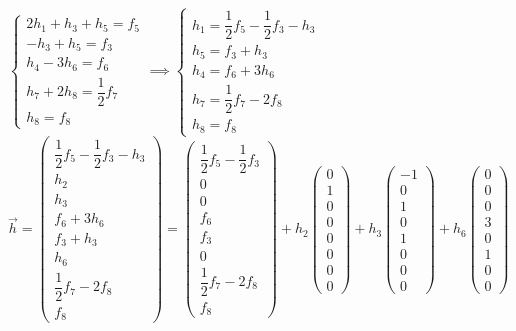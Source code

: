 \documentclass[a4paper, 10pt]{article}
\theoremstyle{theoremdd}
\begin{document}
$\begin{cases}
2h_1 + h_3 + h_5 = f_5 \\
-h_3 + h_5 = f_3 \\
h_4 - 3h_6 = f_6 \\
h_7 + 2h_8 = \dfrac{1}{2}f_7 \\
h_8 = f_8
\end{cases} \implies \begin{cases}
h_1 = \dfrac{1}{2}f_5 - \dfrac{1}{2}f_3 - h_3 \\
h_5 = f_3 + h_3 \\
h_4 = f_6 + 3h_6 \\
h_7 = \dfrac{1}{2}f_7 - 2f_8 \\
h_8 = f_8
\end{cases}$\\
$\vec{h} = \begin{pmatrix}
\dfrac{1}{2}f_5 - \dfrac{1}{2}f_3 - h_3 \\
h_2 \\
h_3 \\
f_6 + 3h_6 \\
f_3 + h_3 \\
h_6 \\
\dfrac{1}{2}f_7 - 2f_8 \\
f_8
\end{pmatrix} = \begin{pmatrix}
\dfrac{1}{2}f_5 - \dfrac{1}{2}f_3 \\
0 \\
0 \\
f_6 \\
f_3 \\
0 \\
\dfrac{1}{2}f_7 - 2f_8 \\
f_8
\end{pmatrix} + h_2 \begin{pmatrix}
0 \\ 1 \\ 0 \\ 0 \\ 0 \\ 0 \\ 0 \\ 0
\end{pmatrix} + h_3 \begin{pmatrix}
-1 \\ 0 \\ 1 \\ 0 \\ 1 \\ 0 \\ 0 \\ 0
\end{pmatrix} + h_6 \begin{pmatrix}
0 \\ 0 \\ 0 \\ 3 \\ 0 \\ 1 \\ 0 \\ 0
\end{pmatrix}$\\
\end{document}
